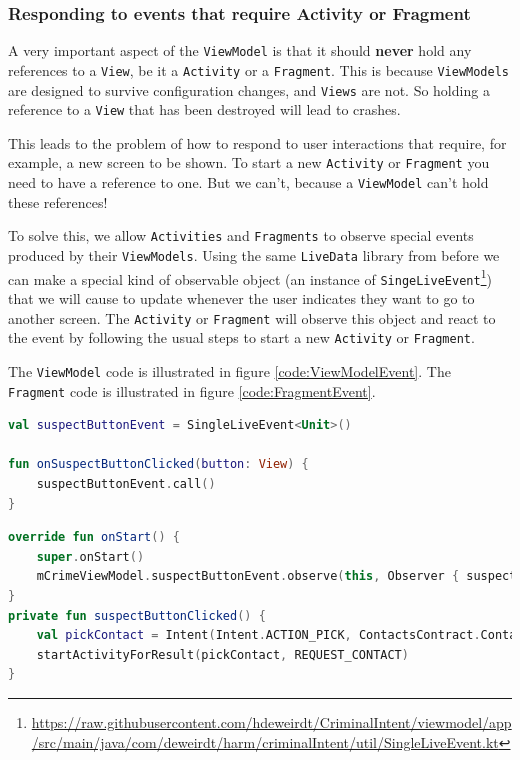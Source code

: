 \subsubsection{Responding to events that require Activity or Fragment}
A very important aspect of the \lstinline!ViewModel! is that it should \textbf{never} hold any references to a \lstinline!View!, be it a \lstinline!Activity! or a \lstinline!Fragment!.
This is because \lstinline!ViewModels! are designed to survive configuration changes, and \lstinline!Views! are not.
So holding a reference to a \lstinline!View! that has been destroyed will lead to crashes. 

This leads to the problem of how to respond to user interactions that require, for example, a new screen to be shown.
To start a new \lstinline!Activity! or \lstinline!Fragment! you need to have a reference to one.
But we can't, because a \lstinline!ViewModel! can't hold these references!

To solve this, we allow \lstinline!Activities! and \lstinline!Fragments! to observe special events produced by their \lstinline!ViewModels!.
Using the same \lstinline!LiveData! library from before we can make a special kind of observable object 
(an instance of \lstinline!SingeLiveEvent!\footnote{\url{https://raw.githubusercontent.com/hdeweirdt/CriminalIntent/viewmodel/app/src/main/java/com/deweirdt/harm/criminalIntent/util/SingleLiveEvent.kt}}) 
that we will cause to update whenever the user indicates they want to go to another screen.
The \lstinline!Activity! or \lstinline!Fragment! will observe this object and react to the event by following the usual steps to start a new \lstinline!Activity! or \lstinline!Fragment!.

The \lstinline!ViewModel! code is illustrated in figure \ref{code:ViewModelEvent}.
The \lstinline!Fragment! code is illustrated in figure \ref{code:FragmentEvent}.
	
\begin{lstlisting}[language=Kotlin, label=code:ViewModelEvent,
caption={The \lstinline!ViewModel! has one \lstinline!SingeLiveEvent! for each interaction that eventually requires action from a \lstinline!Activity! or \lstinline!Fragment!.
The \lstinline!onButtonClicked! functions are referenced in the layout files.}]
val suspectButtonEvent = SingleLiveEvent<Unit>()

fun onSuspectButtonClicked(button: View) {
	suspectButtonEvent.call()
}
\end{lstlisting}

\begin{lstlisting}[language=Kotlin,label=code:FragmentEvent,
caption={The \lstinline!Activities! or \lstinline!Fragments! observe the events from the  \lstinline!ViewModel!, and respond by creating a new \lstinline!Activity! or \lstinline!Fragment!}]
 override fun onStart() {
	super.onStart()
	mCrimeViewModel.suspectButtonEvent.observe(this, Observer { suspectButtonClicked() })
}
private fun suspectButtonClicked() {
	val pickContact = Intent(Intent.ACTION_PICK, ContactsContract.Contacts.CONTENT_URI)
	startActivityForResult(pickContact, REQUEST_CONTACT)
}
\end{lstlisting}